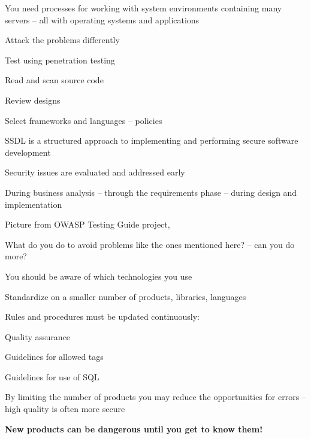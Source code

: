 \documentclass[Screen16to9,17pt]{foils}
\begin{document}

You need processes for working with system environments containing many servers -- all with operating systems and applications

Attack the problems differently
\begin{list2}
\item Test using penetration testing
\item Read and scan source code
\item Review designs
\item Select frameworks and languages -- policies
\end{list2}



\begin{list2}
\item SSDL is a structured approach to implementing and performing secure software development
\item Security issues are evaluated and addressed early
\item During business analysis -- through the requirements phase -- during design and implementation
\item Picture from OWASP Testing Guide project, 
\end{list2}



\begin{list1}
\item What do you do to avoid problems like the ones mentioned here?
-- can you do more?
\item You should be aware of which technologies you use
\item Standardize on a smaller number of products, libraries, languages
\item Rules and procedures must be updated continuously:
\begin{list2}
\item Quality assurance
\item Guidelines for allowed tags
\item Guidelines for use of SQL
\end{list2}
\item By limiting the number of products you may reduce the opportunities for errors -- high quality is often more secure
\item {\bf New products can be dangerous until you get to know them!}
\end{list1}
\end{document}
